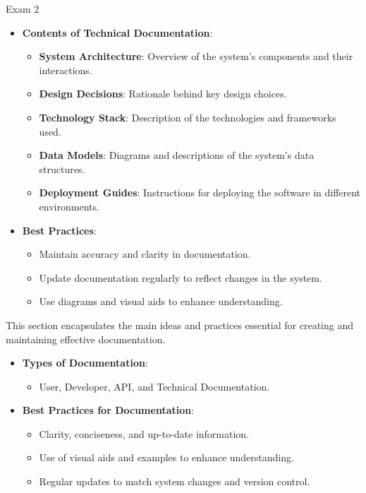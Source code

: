 \begin{examnotes}{Exam 2}
\begin{highlight}
        \begin{itemize}
            \item \textbf{Contents of Technical Documentation}:
                \begin{itemize}
                    \item \textbf{System Architecture}: Overview of the system's components and their interactions.
                    \item \textbf{Design Decisions}: Rationale behind key design choices.
                    \item \textbf{Technology Stack}: Description of the technologies and frameworks used.
                    \item \textbf{Data Models}: Diagrams and descriptions of the system's data structures.
                    \item \textbf{Deployment Guides}: Instructions for deploying the software in different environments.
                \end{itemize}
            \item \textbf{Best Practices}:
                \begin{itemize}
                    \item Maintain accuracy and clarity in documentation.
                    \item Update documentation regularly to reflect changes in the system.
                    \item Use diagrams and visual aids to enhance understanding.
                \end{itemize}
        \end{itemize}
    \end{highlight}
    
    \begin{highlight}
        This section encapsulates the main ideas and practices essential for creating and maintaining effective documentation.
        
        \begin{itemize}
            \item \textbf{Types of Documentation}:
                \begin{itemize}
                    \item User, Developer, API, and Technical Documentation.
                \end{itemize}
            \item \textbf{Best Practices for Documentation}:
                \begin{itemize}
                    \item Clarity, conciseness, and up-to-date information.
                    \item Use of visual aids and examples to enhance understanding.
                    \item Regular updates to match system changes and version control.
                \end{itemize}
        \end{itemize}
    \end{highlight}
\end{examnotes}